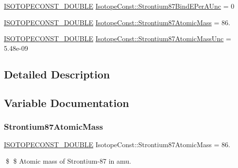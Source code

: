 \begin{DoxyCompactItemize}
\mbox{\hyperlink{group___isotope_const-_macros_ga8f45a7272ce02c0b4c65c44636ed719a}{I\+S\+O\+T\+O\+P\+E\+C\+O\+N\+S\+T\+\_\+\+D\+O\+U\+B\+LE}} \mbox{\hyperlink{group___isotope_const-_strontium-_sr87_ga08e586aadc01d371dfaeaf0e4f78538b}{Isotope\+Const\+::\+Strontium87\+Bind\+E\+Per\+A\+Unc}} = 0
\item 
\mbox{\hyperlink{group___isotope_const-_macros_ga8f45a7272ce02c0b4c65c44636ed719a}{I\+S\+O\+T\+O\+P\+E\+C\+O\+N\+S\+T\+\_\+\+D\+O\+U\+B\+LE}} \mbox{\hyperlink{group___isotope_const-_strontium-_sr87_ga03ec5ec1efef85a85f5a3260ca949917}{Isotope\+Const\+::\+Strontium87\+Atomic\+Mass}} = 86.
\item 
\mbox{\hyperlink{group___isotope_const-_macros_ga8f45a7272ce02c0b4c65c44636ed719a}{I\+S\+O\+T\+O\+P\+E\+C\+O\+N\+S\+T\+\_\+\+D\+O\+U\+B\+LE}} \mbox{\hyperlink{group___isotope_const-_strontium-_sr87_gab9b1778b252c4ef3fbdc97a433b8d985}{Isotope\+Const\+::\+Strontium87\+Atomic\+Mass\+Unc}} = 5.\+48e-\/09
\end{DoxyCompactItemize}


\subsection{Detailed Description}


\subsection{Variable Documentation}
\mbox{\label{group___isotope_const-_strontium-_sr87_ga03ec5ec1efef85a85f5a3260ca949917}} 
\subsubsection{\texorpdfstring{Strontium87\+Atomic\+Mass}{Strontium87AtomicMass}}
{\footnotesize\ttfamily \mbox{\hyperlink{group___isotope_const-_macros_ga8f45a7272ce02c0b4c65c44636ed719a}{I\+S\+O\+T\+O\+P\+E\+C\+O\+N\+S\+T\+\_\+\+D\+O\+U\+B\+LE}} Isotope\+Const\+::\+Strontium87\+Atomic\+Mass = 86.}

\$ \$ Atomic mass of Strontium-\/87 in amu. \mbox{\label{group___isotope_const-_strontium-_sr87_gab9b1778b252c4ef3fbdc97a433b8d985}} 
